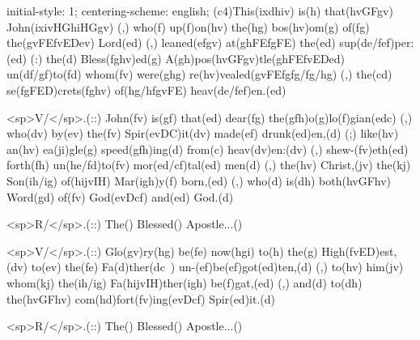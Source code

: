 initial-style: 1;
centering-scheme: english;
(c4)This(ixdhiv) is(h) that(hvGFgv) John(ixivHGhiHGgv) (,) who(f) up(f)on(hv) the(hg) bos(hv)om(g) of(fg) the(gvFEfvEDev) Lord(ed) (,) leaned(efgv) at(ghFEfgFE) the(ed) sup(de/fef)per:(ed) (:) the(d) Bless(fghv)ed(g) A(gh)pos(hvGFgv)tle(ghFEfvEDed) un(df/gf)to(fd) whom(fv) were(ghg) re(hv)vealed(gvFEfgfg/fg/hg) (,) the(cd) se(fgFED)crets(fghv) of(hg/hfgvFE) heav(de/fef)en.(ed)

<sp>V/</sp>.(::) John(fv) is(gf) that(ed) dear(fg) the(gfh)o(g)lo(f)gian(edc) (,) who(dv) by(ev) the(fv) Spir(evDC)it(dv) made(ef) drunk(ed)en,(d) (;) like(hv) an(hv) ea(ji)gle(g) speed(gfh)ing(d) from(c) heav(dv)en:(dv) (,) shew-(fv)eth(ed) forth(fh) un(he/fd)to(fv) mor(ed/cf)tal(ed) men(d) (,) the(hv) Christ,(jv) the(kj) Son(ih/ig) of(hijvIH) Mar(igh)y(f) born,(ed) (,) who(d) is(dh) both(hvGFhv) Word(gd) of(fv) God(evDcf) and(ed) God.(d)

<sp>R/</sp>.(::) The() Blessed() Apostle...()

<sp>V/</sp>.(::) Glo(gv)ry(hg) be(fe) now(hgi) to(h) the(g) High(fvED)est,(dv) to(ev) the(fe) Fa(d)ther(dc~) un-(ef)be(ef)got(ed)ten,(d) (,) to(hv) him(jv) whom(kj) the(ih/ig) Fa(hijvIH)ther(igh) be(f)gat,(ed) (,) and(d) to(dh) the(hvGFhv) com(hd)fort(fv)ing(evDcf) Spir(ed)it.(d)

<sp>R/</sp>.(::) The() Blessed() Apostle...()